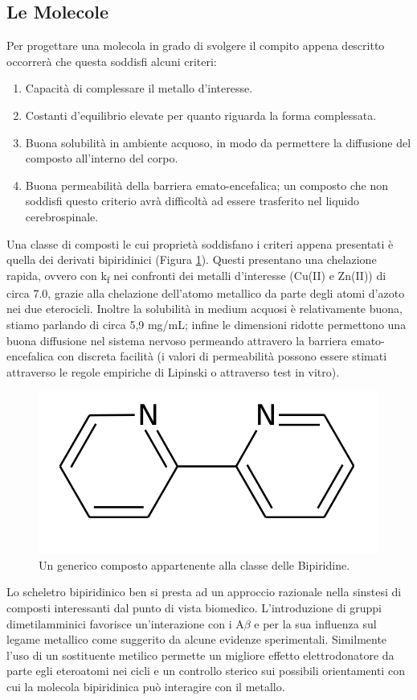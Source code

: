 \documentclass[a4paper, 12pt]{article}
\begin{document}
\subsection{Le Molecole}
\label{sec:bpy_mol}
Per progettare una molecola in grado di svolgere il compito appena descritto occorrerà che questa soddisfi alcuni criteri:
\begin{enumerate}
	\item Capacità di complessare il metallo d'interesse.
	\item Costanti d'equilibrio elevate per quanto riguarda la forma complessata.
	\item Buona solubilità in ambiente acquoso, in modo da permettere la diffusione del composto all'interno del corpo.
	\item Buona permeabilità della barriera emato-encefalica; un composto che non soddisfi questo criterio avrà difficoltà ad essere trasferito nel liquido cerebrospinale.
\end{enumerate}
Una classe di composti le cui proprietà soddisfano i criteri appena presentati è quella dei derivati bipiridinici (Figura \ref{fig:bpy}).
Questi presentano una chelazione rapida, ovvero con k\textsubscript{f} nei confronti dei metalli d'interesse (Cu(II) e Zn(II)) di circa 7.0, grazie alla chelazione dell'atomo metallico da parte degli atomi d'azoto nei due eterocicli. Inoltre la solubilità in medium acquosi è relativamente buona, stiamo parlando di circa 5,9 mg/mL; infine le dimensioni ridotte permettono una buona diffusione nel sistema nervoso permeando attravero la barriera emato-encefalica con discreta facilità (i valori di permeabilità possono essere stimati attraverso le regole empiriche di Lipinski o attraverso test in vitro). \cite{di_high_2003}
\begin{figure}[H]
	\centering
	\includegraphics[width=.3\linewidth]{immagini/bpy.png}
	\caption{Un generico composto appartenente alla classe delle Bipiridine.}
	\label{fig:bpy}
\end{figure}
Lo scheletro bipiridinico ben si presta ad un approccio razionale nella sinstesi di composti interessanti dal punto di vista biomedico.
L'introduzione di gruppi dimetilamminici favorisce un'interazione con i A$\beta$ e per la sua influenza sul legame metallico come suggerito da alcune evidenze sperimentali. Similmente l'uso di un sostituente metilico permette un migliore effetto elettrodonatore da parte egli eteroatomi nei cicli e un controllo sterico sui possibili orientamenti con cui la molecola bipiridinica può interagire con il metallo. \cite{derrick_importance_2016,savelieff_ongoing_2014}
\end{document}
